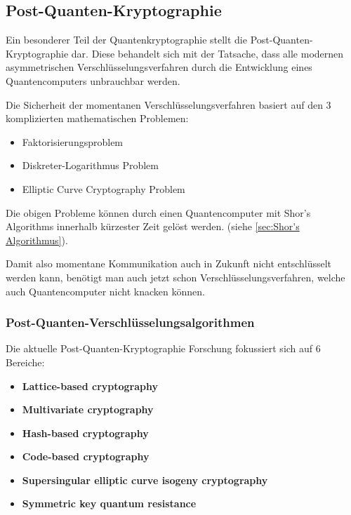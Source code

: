 \subsection{Post-Quanten-Kryptographie}
\label{sec:Post-Quanten-Kryptographie}

Ein besonderer Teil der Quantenkryptographie stellt die Post-Quanten-Kryptographie dar.
Diese behandelt sich mit der Tatsache, dass alle modernen asymmetrischen Verschlüsselungsverfahren durch die Entwicklung eines Quantencomputers unbrauchbar werden.

Die Sicherheit der momentanen Verschlüsselungsverfahren basiert auf den 3 komplizierten mathematischen Problemen:

\begin{itemize}
    \item Faktorisierungsproblem
    \item Diskreter-Logarithmus Problem
    \item Elliptic Curve Cryptography Problem
\end{itemize}

Die obigen Probleme können durch einen Quantencomputer mit Shor's Algorithms innerhalb kürzester Zeit gelöst werden. (siehe \ref{sec:Shor's Algorithmus}).

Damit also momentane Kommunikation auch in Zukunft nicht entschlüsselt werden kann, benötigt man auch jetzt schon Verschlüsselungsverfahren, welche auch Quantencomputer nicht knacken können. \cite{postquantumwiki}


\subsubsection{Post-Quanten-Verschlüsselungsalgorithmen}
\label{sec:Post-Quanten-Verschluesselungsalgorithmen}

Die aktuelle Post-Quanten-Kryptographie Forschung fokussiert sich auf 6 Bereiche: \cite{postquantumwiki}

\begin{itemize}
    \item \textbf{Lattice-based cryptography}
    \item \textbf{Multivariate cryptography}
    \item \textbf{Hash-based cryptography}
    \item \textbf{Code-based cryptography}
    \item \textbf{Supersingular elliptic curve isogeny cryptography}
    \item \textbf{Symmetric key quantum resistance}
\end{itemize}


